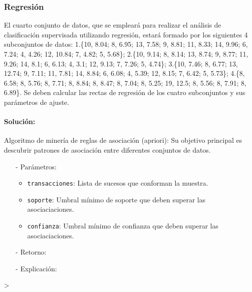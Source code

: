 \documentclass[a4paper, 12pt]{article}
\begin{document}
	
	\subsubsection{Regresión}
	
	El cuarto conjunto de datos, que se empleará para realizar el análisis de clasificación supervisada utilizando regresión, estará formado por los siguientes 4 subconjuntos de datos: 1.\{10, 8.04; 8, 6.95; 13, 7.58; 9, 8.81; 11, 8.33; 14, 9.96; 6, 7.24; 4, 4.26; 12, 10.84; 7, 4.82; 5, 5.68\}; 2.\{10, 9.14; 8, 8.14; 13, 8.74; 9, 8.77; 11, 9.26; 14, 8.1; 6, 6.13; 4, 3.1; 12, 9.13; 7, 7.26; 5, 4.74\}; 3.\{10, 7.46; 8, 6.77; 13, 12.74; 9, 7.11; 11, 7.81; 14, 8.84; 6, 6.08; 4, 5.39; 12, 8.15; 7, 6.42; 5, 5.73\}; 4.\{8, 6.58; 8, 5.76; 8, 7.71; 8, 8.84; 8, 8.47; 8, 7.04; 8, 5.25; 19, 12.5; 8, 5.56; 8, 7.91; 8, 6.89\}. Se deben calcular las rectas de regresión de los cuatro subconjuntos y sus parámetros de ajuste.
		
	\paragraph{Solución:}
			Algoritmo de minería de reglas de asociación (apriori): Su objetivo principal es descubrir patrones de asociación entre diferentes conjuntos de datos.
			\begin{itemize}
				\item[-] Parámetros:
				\begin{itemize}
					\item \texttt{transacciones}: Lista de sucesos que conforman la muestra.
					\item \texttt{soporte}: Umbral mínimo de soporte que deben superar las asociaciaciones.
					\item \texttt{confianza}: Umbral mínimo de confianza que deben superar las asociaciaciones.
				\end{itemize}
				
				\item[-] Retorno: 
				
				\item[-] Explicación: 

			\end{itemize}
\begin{Schunk}
\begin{Sinput}
> 
\end{Sinput}
\end{Schunk}

  
\end{document}
